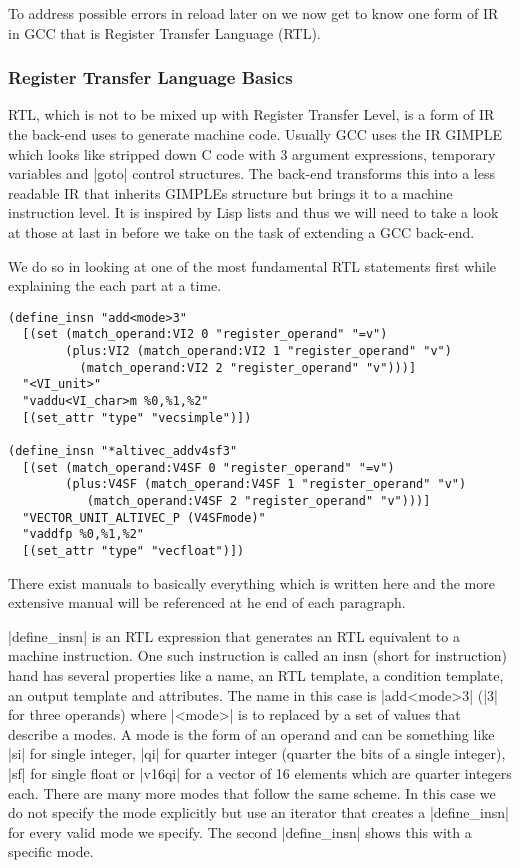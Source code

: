 To address possible errors in reload later on we now get to know one form of IR in GCC that is Register Transfer Language (RTL).

\subsubsection{Register Transfer Language Basics}
RTL, which is not to be mixed up with Register Transfer Level, is a form of IR the back-end uses to generate machine code.
Usually GCC uses the IR GIMPLE which looks like stripped down C code with 3 argument expressions, temporary variables and |goto| control structures.
The back-end transforms this into a less readable IR that inherits GIMPLEs structure but brings it to a machine instruction level.
It is inspired by Lisp lists and thus we will need to take a look at those at last in before we take on the task of extending a GCC back-end.

We do so in looking at one of the most fundamental RTL statements first while explaining the each part at a time.

\begin{lstlisting}
(define_insn "add<mode>3"
  [(set (match_operand:VI2 0 "register_operand" "=v")
        (plus:VI2 (match_operand:VI2 1 "register_operand" "v")
		  (match_operand:VI2 2 "register_operand" "v")))]
  "<VI_unit>"
  "vaddu<VI_char>m %0,%1,%2"
  [(set_attr "type" "vecsimple")])

(define_insn "*altivec_addv4sf3"
  [(set (match_operand:V4SF 0 "register_operand" "=v")
        (plus:V4SF (match_operand:V4SF 1 "register_operand" "v")
		   (match_operand:V4SF 2 "register_operand" "v")))]
  "VECTOR_UNIT_ALTIVEC_P (V4SFmode)"
  "vaddfp %0,%1,%2"
  [(set_attr "type" "vecfloat")])
\end{lstlisting}

There exist manuals to basically everything which is written here and the more extensive manual will be referenced at he end of each paragraph.

|define_insn| is an RTL expression that generates an RTL equivalent to a machine instruction.
One such instruction is called an insn (short for instruction) hand has several properties like a name, an RTL template, a condition template, an output template and attributes. \cite{GCCint:defineinsn}
The name in this case is |add<mode>3| (|3| for three operands) where |<mode>| is to replaced by a set of values that describe a modes. \cite{GCCint:stdnames}
A mode is the form of an operand and can be something like |si| for single integer, |qi| for quarter integer (quarter the bits of a single integer), |sf| for single float or |v16qi| for a vector of 16 elements which are quarter integers each. 
There are many more modes that follow the same scheme.
In this case we do not specify the mode explicitly but use an iterator that creates a |define_insn| for every valid mode we specify. 
The second |define_insn| shows this with a specific mode.

